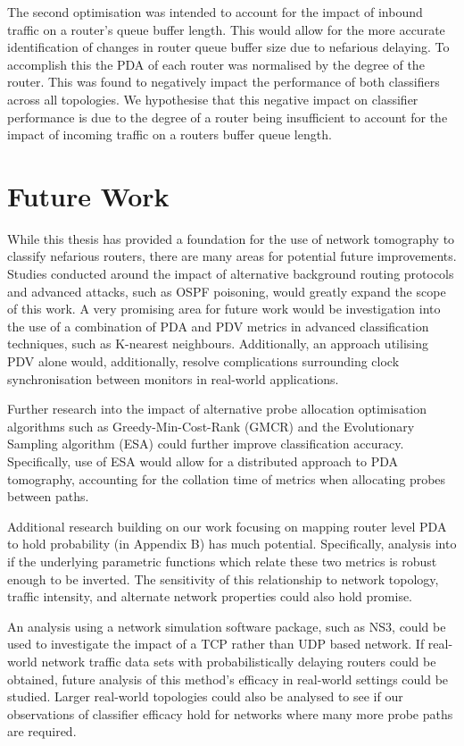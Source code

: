 The second optimisation was intended to account for the impact of inbound traffic on a router's queue buffer length. This would allow for the more accurate identification of changes in router queue buffer size due to nefarious delaying. To accomplish this the PDA of each router was normalised by the degree of the router. This was found to negatively impact the performance of both classifiers across all topologies. We hypothesise that this negative impact on classifier performance is due to the degree of a router being insufficient to account for the impact of incoming traffic on a routers buffer queue length.\par

\section{Future Work}
\label{sec:Cfuture}
While this thesis has provided a foundation for the use of network tomography to classify nefarious routers, there are many areas for potential future improvements. Studies conducted around the impact of alternative background routing protocols and advanced attacks, such as OSPF poisoning, would greatly expand the scope of this work. A very promising area for future work would be investigation into the use of a combination of PDA and PDV metrics in advanced classification techniques, such as K-nearest neighbours. Additionally, an approach utilising PDV alone would, additionally, resolve complications surrounding clock synchronisation between monitors in real-world applications.\par
Further research into the impact of alternative probe allocation optimisation algorithms such as Greedy-Min-Cost-Rank (GMCR) and the Evolutionary Sampling algorithm (ESA) could further improve classification accuracy. Specifically, use of ESA would allow for a distributed approach to PDA tomography, accounting for the collation time of metrics when allocating probes between paths.\par
Additional research building on our work focusing on mapping router level PDA to hold probability (in Appendix B) has much potential. Specifically, analysis into if the underlying parametric functions which relate these two metrics is robust enough to be inverted. The sensitivity of this relationship to network topology, traffic intensity, and alternate network properties could also hold promise.\par 
An analysis using a network simulation software package, such as NS3, could be used to investigate the impact of a TCP rather than UDP based network. If real-world network traffic data sets with probabilistically delaying routers could be obtained, future analysis of this method's efficacy in real-world settings could be studied. Larger real-world topologies could also be analysed to see if our observations of classifier efficacy hold for networks where many more probe paths are required.\par
